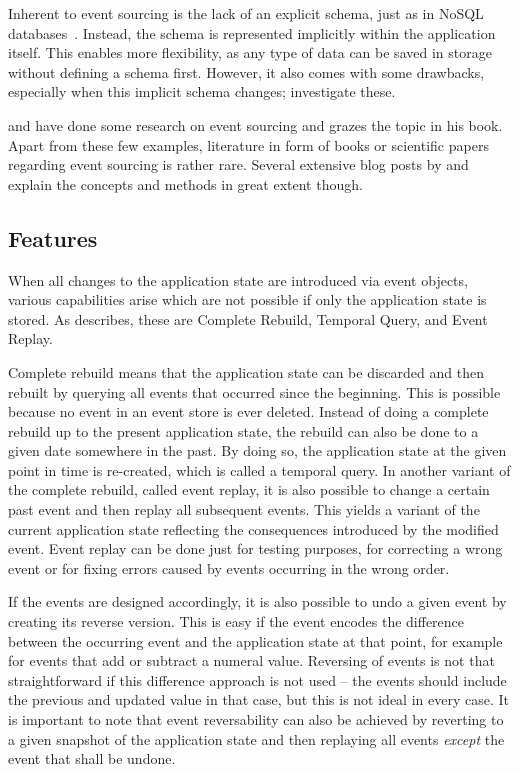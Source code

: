 Inherent to event sourcing is the lack of an explicit schema, just as in NoSQL databases~\cite{fowler2013schemaless}.
Instead, the schema is represented implicitly within the application itself.
This enables more flexibility, as any type of data can be saved in storage without defining a schema first.
However, it also comes with some drawbacks, especially when this implicit schema changes; \citet{Overeem2017} investigate these.

\citet{Overeem2017} and \citet{Erb2016} have done some research on event sourcing and \citet{evans2004domain} grazes the topic in his book.
Apart from these few examples, literature in form of books or scientific papers regarding event sourcing is rather rare.
Several extensive blog posts by \citet{WEB:Fowler:2005} and \citet{young2010whyeventsourcing} explain the concepts and methods in great extent though.

\subsection{Features}

When all changes to the application state are introduced via event objects, various capabilities arise which are not possible if only the application state is stored.
As \citet{WEB:Fowler:2005} describes, these are Complete Rebuild, Temporal Query, and Event Replay.

Complete rebuild means that the application state can be discarded and then rebuilt by querying all events that occurred since the beginning.
This is possible because no event in an event store is ever deleted.
Instead of doing a complete rebuild up to the present application state, the rebuild can also be done to a given date somewhere in the past.
By doing so, the application state at the given point in time is re-created, which is called a temporal query.
In another variant of the complete rebuild, called event replay, it is also possible to change a certain past event and then replay all subsequent events.
This yields a variant of the current application state reflecting the consequences introduced by the modified event.
Event replay can be done just for testing purposes, for correcting a wrong event or for fixing errors caused by events occurring in the wrong order.

If the events are designed accordingly, it is also possible to undo a given event by creating its reverse version.
This is easy if the event encodes the difference between the occurring event and the application state at that point, for example for events that add or subtract a numeral value.
Reversing of events is not that straightforward if this difference approach is not used -- the events should include the previous and updated value in that case, but this is not ideal in every case.
It is important to note that event reversability can also be achieved by reverting to a given snapshot of the application state and then replaying all events \emph{except} the event that shall be undone.

